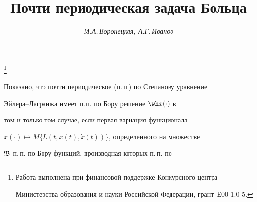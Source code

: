 












\author{\it М.А.\,Воронецкая, А.Г.\,Иванов}




\title{Почти периодическая задача Больца}


\thanks{Работа выполнена при финансовой поддержке Конкурсного центра 


Министерства образования и науки Российской Федерации, грант \No\,Е00-1.0-5.}





\date{}




\pagestyle{plain} %







\maketitle


\label{begin}








\setcounter{section}{1}


\setcounter{equation}{0}


\setcounter{thms}{0}


\setcounter{lems}{0}








Показано, что почти периодическое (п.\,п.) по Степанову уравнение


Эйлера--Лагранжа имеет п.\,п. по Бору решение $\wh x(\cdot)$ в


том и только том случае, если первая вариация функционала


$x(\cdot)\mapsto M\{L(t,x(t),\Dot x(t))\}$, определенного на множестве


$\frak B$ п.\,п. по Бору функций, производная которых п.\,п. по


